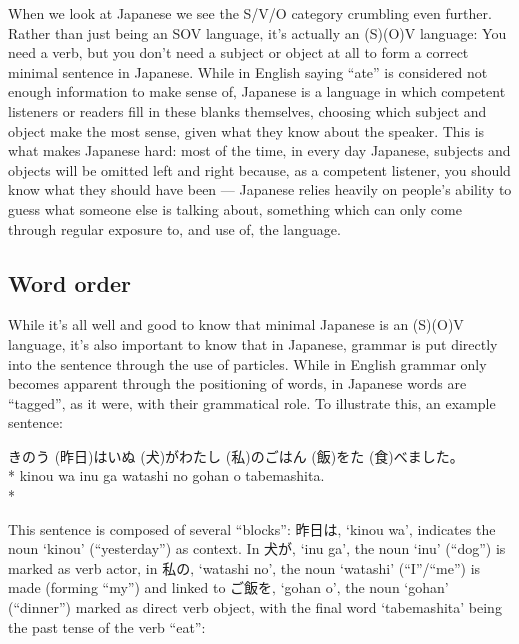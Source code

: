 \documentclass[11pt, b5paper, twoside, openright, onecolumn]{book}
\makeatletter
\newcommand*{\rubystack}[2]{{\relscale{0.5}%
  \begin{tabular}[b]{@{}c@{}}%
    {#1}\\%
   {\textscale{2}{#2}}%
  \end{tabular}}%
}
\DeclareRobustCommand*{\ruby}[2]{%
  \mbox{%
    \setlength{\parskip}{0ex}%
    \BeginAccSupp{method=pdfstringdef,ActualText={#1}}%
      \rubystack{\phantom{#2}}{#1}%
      \llap{%
        \rubystack{#2}{\phantom{#1}}%
      }%
    \EndAccSupp{}%
  }%
}
\renewcommand*{\ruby}[2]{#2 (#1)}%
\newenvironment{exampleblock}{
\setlength{\parindent}{0.6in}
\begin{minipage}[t]{\dimexpr\textwidth-\parindent}}
{\end{minipage}}
\makeatother
\begin{document}
When we look at Japanese we see the S/V/O category crumbling even further. Rather than just being an SOV language‚ it’s actually an (S)(O)V language: You need a verb‚ but you don’t need a subject or object at all to form a correct minimal sentence in Japanese. While in English saying “ate” is considered not enough information to make sense of‚ Japanese is a language in which competent listeners or readers fill in these blanks themselves‚ choosing which subject and object make the most sense‚ given what they know about the speaker.  This is what makes Japanese hard: most of the time‚ in every day Japanese‚ subjects and objects will be omitted left and right because‚ as a competent listener‚ you should know what they should have been — Japanese relies heavily on people’s ability to guess what someone else is talking about‚ something which can only come through regular exposure to‚ and use of‚ the language.

\subsection{Word order}

While it’s all well and good to know that minimal Japanese is an (S)(O)V language‚ it’s also important to know that in Japanese‚ grammar is put directly into the sentence through the use of particles. While in English grammar only becomes apparent through the positioning of words‚ in Japanese words are “tagged”‚ as it were‚ with their grammatical role. To illustrate this‚ an example sentence:

\vspace{0.4cm}
\begin{exampleblock}
\ruby{昨日}{きのう}は\ruby{犬}{いぬ}が\ruby{私}{わたし}のご\ruby{飯}{はん}を\ruby{食}{た}べました。 \\* 
kinou wa inu ga watashi no gohan o tabemashita. \\* 
\end{exampleblock}
\vspace{0.2cm}

This sentence is composed of several “blocks”: 昨日は‚ ‘kinou wa’‚ indicates the noun ‘kinou’ (“yesterday”) as context. In 犬が‚ ‘inu ga’‚ the noun ‘inu’ (“dog”) is marked as verb actor‚ in 私の‚ ‘watashi no’‚ the noun ‘watashi’ (“I”/“me”) is made  (forming “my”) and linked to ご飯を‚ ‘gohan o’‚ the noun ‘gohan’ (“dinner”) marked as direct verb object‚ with the final word ‘tabemashita’ being the past tense of the verb “eat”:
\end{document}
